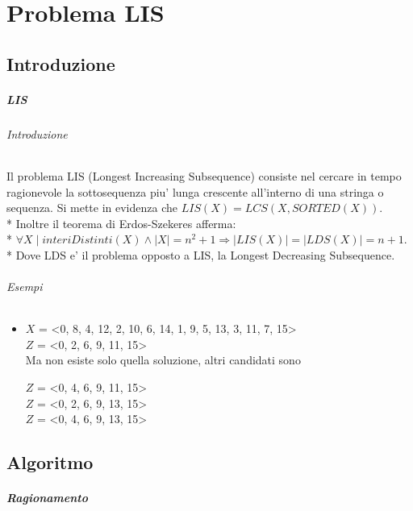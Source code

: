 \chapter{Problema LIS}

\section{Introduzione}

\paragraph{LIS}

\subparagraph{Introduzione}

Il problema LIS (Longest Increasing Subsequence) consiste nel cercare in tempo ragionevole la sottosequenza piu' lunga crescente all'interno di una stringa o sequenza.
Si mette in evidenza che $LIS(X) = LCS(X, SORTED(X))$. \\*
Inoltre il teorema di Erdos-Szekeres afferma: \\*
$\forall X \mid interiDistinti(X) \land |X| = n^2 + 1 \Rightarrow |LIS(X)| = |LDS(X)| = n+1$. \\*
Dove LDS e' il problema opposto a LIS, la Longest Decreasing Subsequence.

\subparagraph{Esempi}

\begin{itemize}

\item

$X$ = <0, 8, 4, 12, 2, 10, 6, 14, 1, 9, 5, 13, 3, 11, 7, 15> \\
$Z$ = <0, 2, 6, 9, 11, 15> \\

Ma non esiste solo quella soluzione, altri candidati sono

$Z$ = <0, 4, 6, 9, 11, 15> \\
$Z$ = <0, 2, 6, 9, 13, 15> \\
$Z$ = <0, 4, 6, 9, 13, 15> \\

\end{itemize}

\section{Algoritmo}

\paragraph{Ragionamento}


